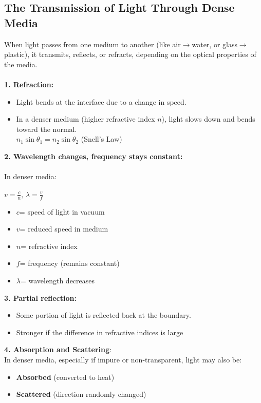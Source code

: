\documentclass[12pt]{article}
\begin{document}
\subsection{The Transmission of Light Through Dense Media}
When light passes from one medium to another (like air$\rightarrow$water, or glass$\rightarrow$plastic), it transmits, reflects, or refracts, depending on the optical properties of the media.\\\\
\textbf{1. Refraction:}\\
\begin{itemize}
\item Light bends at the interface due to a change in speed.
\item In a denser medium (higher refractive index $n$), light slows down and bends toward the normal.\\
$n_1\sin \theta_1=n_2\sin\theta_2$ (Snell's Law)
\end{itemize}
\textbf{2. Wavelength changes, frequency stays constant:}\\\\
In denser media:\\\\$v=\frac{c}{n},\,\lambda=\frac{v}{f}$
\begin{itemize}
\item $c$= speed of light in vacuum
\item $v$= reduced speed in medium
\item $n$= refractive index
\item $f$= frequency (remains constant)
\item $\lambda$= wavelength decreases
\end{itemize}
\textbf{3. Partial reflection:}
\begin{itemize}
\item Some portion of light is reflected back at the boundary.
\item Stronger if the difference in refractive indices is large
\end{itemize}
\textbf{4. Absorption and Scattering}:\\
In denser media, especially if impure or non-transparent, light may also be:
\begin{itemize}
\item \textbf{Absorbed} (converted to heat)
\item \textbf{Scattered} (direction randomly changed)
\end{itemize}
\end{document}
